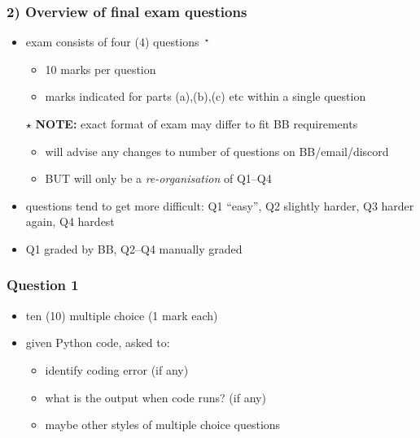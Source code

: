 \documentclass[english,14pt]{beamer}
\begin{document}

\begin{frame}[fragile]

\frametitle{2) Overview of final exam questions}

\begin{itemize}
	\item exam consists of four (4) questions~$^\star$
	\begin{itemize}
		\item 10 marks per question
		\item marks indicated for parts (a),(b),(c) etc within a single question
	\end{itemize}
	\item[$\star$] \textbf{NOTE:} exact format of exam may differ to fit BB requirements
		\begin{itemize}
		\item will advise any changes to number of questions on BB/email/discord
		\item BUT will only be a \emph{re-organisation} of Q1--Q4
	\end{itemize}

	\item questions tend to get more difficult: Q1 ``easy'', Q2 slightly harder, Q3 harder again, Q4 hardest
	\item Q1 graded by BB, Q2--Q4 manually graded
\end{itemize}
\end{frame}


\begin{frame}[fragile]

\frametitle{Question 1}

\begin{itemize}
	\item ten (10) multiple choice (1 mark each)
	\item[]
	\item given Python code, asked to:
	\begin{itemize}
		\item identify coding error (if any)
		\item what is the output when code runs? (if any)
		\item[]
		\item maybe other styles of multiple choice questions
	\end{itemize}
\end{itemize}

\end{frame}
\end{document}
